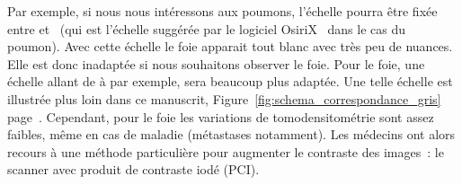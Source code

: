 \documentclass[main.tex]{subfiles}
\begin{document}
Par exemple, si nous nous intéressons aux poumons, l'échelle pourra être fixée entre  et~ (qui est l'échelle suggérée par le logiciel OsiriX~\cite{rosset2004osirix,ratib2006open} dans le cas du poumon). Avec cette échelle le foie apparait tout blanc avec très peu de nuances. Elle est donc inadaptée si nous  souhaitons observer le foie. Pour le foie, une échelle allant de  à  par exemple, sera beaucoup plus adaptée. 
Une telle échelle est illustrée plus loin dans ce manuscrit, \cf Figure~\ref{fig:schema_correspondance_gris} page~\pageref{fig:schema_correspondance_gris}.
Cependant, pour le foie les variations de tomodensitométrie sont assez faibles, même en cas de maladie (métastases notamment). Les médecins ont alors recours à une méthode particulière pour augmenter le contraste des images~: le scanner avec produit de contraste iodé (PCI).
\end{document}
